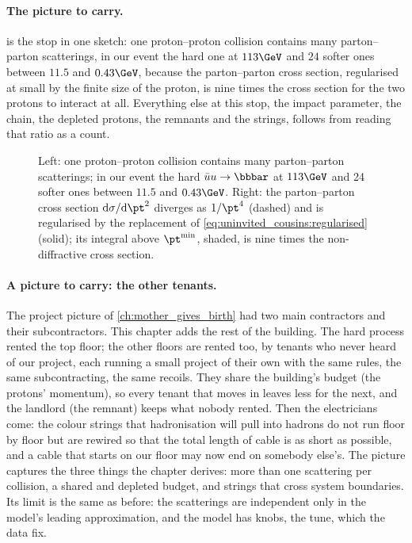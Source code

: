 \paragraph{The picture to carry.}
 is the stop in one sketch:
one proton--proton collision contains many parton--parton scatterings, in
our event the hard one at $113\GeV$ and $24$ softer ones between $11.5$
and $0.43\GeV$, because the parton--parton cross section, regularised at
small \pt by the finite size of the proton, is nine times the cross section
for the two protons to interact at all. Everything else at this stop, the
impact parameter, the chain, the depleted protons, the remnants and the
strings, follows from reading that ratio as a count.

\begin{figure}[htbp]\centering
\resizebox{\textwidth}{!}{}
\caption[One collision, many scatterings, and the regularised cross
section]{Left: one proton--proton collision contains many parton--parton
scatterings; in our event the hard $\bar uu\to\bbbar$ at $113\GeV$ and 24
softer ones between $11.5$ and $0.43\GeV$. Right: the parton--parton cross
section $\mathrm{d}\sigma/\mathrm{d}\pt^2$ diverges as $1/\pt^4$ (dashed)
and is regularised by the replacement of \cref{eq:uninvited_cousins:regularised}
(solid); its integral above $\pt^{\min}$, shaded, is nine times the
non-diffractive cross section.}
\label{fig:uninvited_cousins:two_protons_sketch}
\end{figure}

\paragraph{A picture to carry: the other tenants.} The project picture of
\cref{ch:mother_gives_birth} had two main contractors and their
subcontractors. This chapter adds the rest of the building. The hard process
rented the top floor; the other floors are rented too, by tenants who never
heard of our project, each running a small project of their own with the
same rules, the same subcontracting, the same recoils. They share the
building's budget (the protons' momentum), so every tenant that moves in
leaves less for the next, and the landlord (the remnant) keeps what nobody
rented. Then the electricians come: the colour strings that hadronisation
will pull into hadrons do not run floor by floor but are rewired so that
the total length of cable is as short as possible, and a cable that starts
on our floor may now end on somebody else's. The picture captures the three
things the chapter derives: more than one scattering per collision, a
shared and depleted budget, and strings that cross system boundaries. Its
limit is the same as before: the scatterings are independent only in the
model's leading approximation, and the model has knobs, the tune, which
the data fix.

